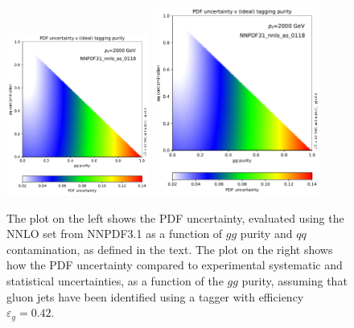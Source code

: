 \begin{figure}
\begin{center}
\includegraphics[width=0.42\textwidth, page=1]{figs/performance-plots.pdf} \hfill
\includegraphics[width=0.49\textwidth, page=2]{figs/performance-plots.pdf}
\caption{The plot on the left shows the PDF uncertainty, evaluated using the NNLO set from NNPDF3.1 as a function of $gg$ purity and $qq$ contamination, as defined in the text.
%
The plot on the right shows how the PDF uncertainty compared to experimental systematic and statistical uncertainties, as a function of the $gg$ purity, assuming that  gluon jets have been identified using a tagger with efficiency $\varepsilon_g=0.42$. }
\label{fig:pdf_unc_studies} 
\end{center}
\end{figure}

